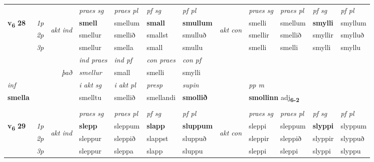 \begin{longtable}[l]{X>{\footnotesize\itshape}llXXXXlXXXX}
 & &   & \textit{praes sg}  & \textit{praes pl}    & \textit{ pf sg} & \textit{pf pl} & & \textit{praes sg}  & \textit{praes pl}    & \textit{pf sg} & \textit{pf pl }  \\ \cmidrule{4-7} \cmidrule{9-12}
 \multirow{2}{*}{{{\textbf{v{\textsubscript{6}}} \Large{\textbf{28}}}}}  & 1p & \multirow{3}{*}{\begin{turn}{90}\textit{akt ind}\end{turn}} & \textbf{smell} & smellum & \textbf{small} & \textbf{smullum} & \multirow{3}{*}{\begin{turn}{90}\textit{akt con}\end{turn}} &smelli & smellum & \textbf{smylli} & smyllum\\*
 & 2p &  &  smellur  & smellið & smallst & smulluð & & smellir & smellið & smyllir & smylluð \\*
 & 3p &  & smellur & smella & small & smullu & & smelli & smelli& smylli & smyllu \\*
\cmidrule{4-7} \cmidrule{9-12}

   && &  \textit{ind praes} & \textit{ind pf} & \textit{con praes} & \textit{con pf} \\*
\multicolumn{3}{r}{\textit{það}} & smellur & small & smelli & smylli \\*

\cmidrule{4-7}
   {\textit{inf}} & &  & \textit{i akt sg} & \textit{i akt pl}   & \textit{presp} & \textit{supin}  && \textit{pp m} \\*
  {\textbf{smella}} & && smelltu  & smellið   & smellandi &  \textbf{smollið}  && \multicolumn{2}{l}{\textbf{smollinn} adj\textbf{\textsubscript{6-2}}} \\*

\midrule
  & \\
   \midrule
 & &   & \textit{praes sg}  & \textit{praes pl}    & \textit{ pf sg} & \textit{pf pl} & & \textit{praes sg}  & \textit{praes pl}    & \textit{pf sg} & \textit{pf pl }  \\ \cmidrule{4-7} \cmidrule{9-12}
 \multirow{2}{*}{{{\textbf{v{\textsubscript{6}}} \Large{\textbf{29}}}}}  & 1p & \multirow{3}{*}{\begin{turn}{90}\textit{akt ind}\end{turn}} & \textbf{slepp} & sleppum & \textbf{slapp} & \textbf{sluppum} & \multirow{3}{*}{\begin{turn}{90}\textit{akt con}\end{turn}} &sleppi & sleppum & \textbf{slyppi} & slyppum\\*
 & 2p &  &  sleppur  & sleppið & slappst & sluppuð & & sleppir & sleppið & slyppir & slyppuð \\*
 & 3p &  & sleppur & sleppa & slapp & sluppu & & sleppi & sleppi& slyppi & slyppu \\*
\cmidrule{4-7} \cmidrule{9-12}


\end{longtable}
